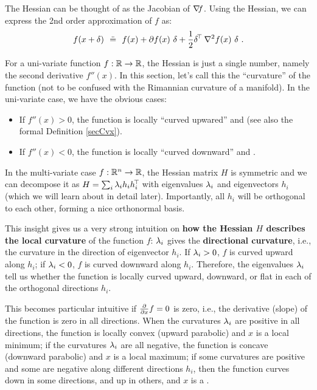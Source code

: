 The Hessian can be thought of as the
Jacobian of ${\nabla_{\!\!}} f$. Using the Hessian, we can express the 2nd order
approximation of $f$ as:
\begin{equation}
f(x+\delta) ~~\ddot=~~ f(x) + \partial f(x)~ \delta + \frac{1}{2} \delta^{\!\top\!}~ {\nabla_{\!\!}^2} f(x)~ \delta ~.
\end{equation}

For a uni-variate function $f:{\mathbb{R}} \to {\mathbb{R}}$, the Hessian is just a single number, namely the second derivative $f''(x)$. In this section, let's call this the ``curvature'' of the function (not to be confused with the Rimannian curvature of a manifold). In the uni-variate case, we have the obvious cases:
\begin{itemize}
\item If $f''(x) >0$, the function is locally ``curved upwared'' and   (see also the formal Definition \ref{secCvx}).
\item If $f''(x) <0$, the function is locally ``curved downward'' and  .
\end{itemize}

In the multi-variate case $f:{\mathbb{R}}^n \to {\mathbb{R}}$, the Hessian matrix $H$ is symmetric and we can decompose it as $H = \sum_i \lambda_i
 h_i h_i^{\!\top\!}$ with eigenvalues $\lambda_i$ and eigenvectors $h_i$ (which we will learn about in detail later). Importantly, all $h_i$ will be orthogonal to each other, forming a nice orthonormal basis.

This insight gives us a very strong intuition on \textbf{how the Hessian $H$ describes the local curvature} of the function $f$:
$\lambda_i$ gives the \textbf{directional curvature}, i.e., the curvature in the direction of eigenvector $h_i$. If $\lambda_i>0$, $f$ is curved upward along $h_i$; if
$\lambda_i<0$, $f$ is curved downward along $h_i$. Therefore, the eigenvalues $\lambda_i$ tell us whether the function is locally curved upward, downward, or flat in each of the orthogonal directions $h_i$.

This becomes particular intuitive if $\textstyle\frac{\partial}{\partial x} f=0$ is zero, i.e., the derivative (slope) of the function is zero in all directions. When the curvatures $\lambda_i$ are positive in all directions, the function is locally convex (upward parabolic) and $x$ is a local minimum; if the curvatures $\lambda_i$ are all negative, the function is concave (downward parabolic) and $x$ is a local maximum; if some curvatures are positive and some are negative along different directions $h_i$, then the function curves down in some directions, and up in others, and $x$ is a .

